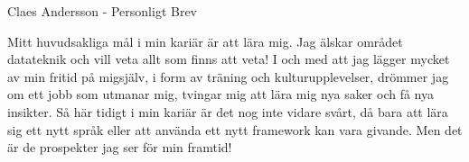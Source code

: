 \documentclass[a4paper,10pt]{article}
\begin{document}
{\huge Claes Andersson - Personligt Brev}
 
 Mitt huvudsakliga mål i min kariär är att lära mig. Jag älskar området datateknik och vill veta allt som finns att veta! I och med att jag lägger mycket av min fritid på migsjälv, i form av träning och kulturupplevelser, drömmer jag om ett jobb som utmanar mig, tvingar mig att lära mig nya saker och få nya insikter. Så här tidigt i min kariär är det nog inte vidare  svårt, då bara att lära sig ett nytt språk eller att använda ett nytt framework kan vara givande. Men det är de prospekter jag ser för min framtid!
 
 
\end{document}
